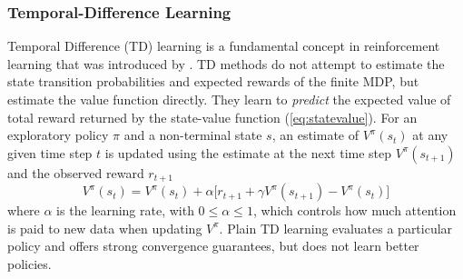 \subsubsection{Temporal-Difference Learning}
Temporal Difference (TD) learning is a fundamental concept in reinforcement
learning that was introduced by . TD methods do not
attempt to estimate the state transition probabilities and expected rewards of
the finite MDP, but estimate the value function directly. They learn to
\textit{predict} the expected value of total reward returned by the state-value
function (\ref{eq:statevalue}).  For an exploratory policy $\pi$ and a
non-terminal state $s$, an estimate of $V^\pi(s_t)$ at any given time step $t$
is updated using the estimate at the next time step $V^\pi(s_{t+1})$ and the
observed reward $r_{t+1}$
\begin{equation}
V^\pi(s_t) = V^\pi(s_t) + \alpha \bigl[r_{t+1} + \gamma
V^\pi(s_{t+1}) - V^\pi(s_t) \bigr]
\end{equation}
where $\alpha$ is the learning rate, with $0 \leq \alpha \leq 1$, which controls
how much attention is paid to new data when updating $V^\pi$.  Plain TD
learning evaluates a particular policy and offers strong convergence
guarantees, but does not learn better policies.

